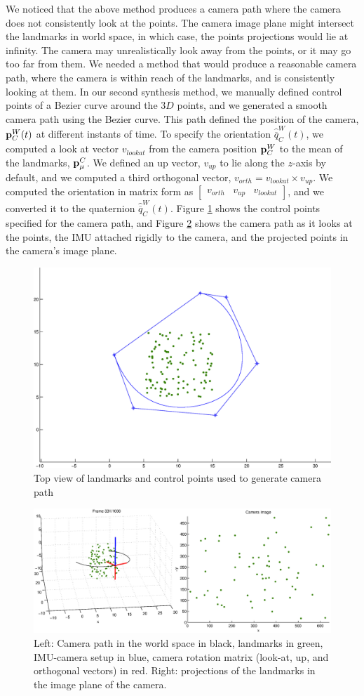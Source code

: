 We noticed that the above method produces a camera path where the camera does not consistently look at the points. The camera image plane might intersect the landmarks in world space, in which case, the points projections would lie at infinity. The camera may unrealistically look away from the points, or it may go too far from them. We needed a method that would produce a reasonable camera path, where the camera is within reach of the landmarks, and is consistently looking at them. In our second synthesis method, we manually defined control points of a Bezier curve around the $3D$ points, and we generated a smooth camera path using the Bezier curve. This path defined the position of the camera, $\mathbf{p}_C^W(t)$ at different instants of time. To specify the orientation $\hat{\overline{q}}_C^W(t)$, we computed a look at vector $v_{lookat}$ from the camera position $\mathbf{p}_C^W$ to the mean of the landmarks, $\mathbf{p}_{\mu}^C$. We defined an up vector, $v_{up}$ to lie along the $z$-axis by default, and we computed a third orthogonal vector, $v_{orth}=v_{lookat} \times v_{up}$. We computed the orientation in matrix form as $\begin{bmatrix}v_{orth} &v_{up}& v_{lookat}\end{bmatrix}$, and we converted it to the quaternion $\hat{\overline{q}}_C^W(t)$. Figure \ref{synthcontrolpts} shows the control points specified for the camera path, and Figure \ref{synthpath} shows the camera path as it looks at the points, the IMU attached rigidly to the camera, and the projected points in the camera's image plane.
\begin{figure}[t]
\centering
\includegraphics[width=.5\linewidth]{synth_controlpts.eps}
\caption{Top view of landmarks and control points used to generate camera path}
\label{synthcontrolpts}
\end{figure}
\begin{figure}[t]
\centering
\includegraphics[width=\linewidth]{synth_path.eps}
\caption{Left: Camera path in the world space in black, landmarks in green, IMU-camera setup in blue, camera rotation matrix (look-at, up, and orthogonal vectors) in red. Right: projections of the landmarks in the image plane of the camera.}
\label{synthpath}
\end{figure}